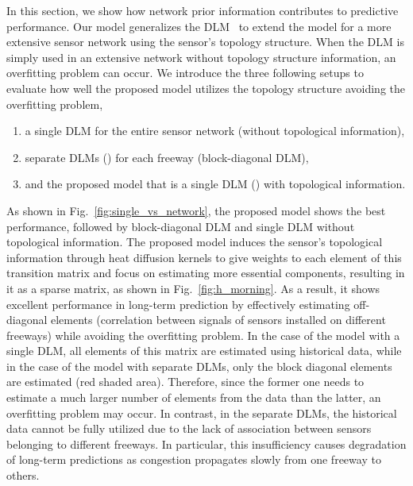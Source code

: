 \documentclass[journal]{IEEEtran}
\begin{document}
In this section, we show how network prior information contributes to predictive performance. 
Our model generalizes the DLM~\cite{kwak2020travel} to extend the model for a more extensive sensor network using the sensor's topology structure. 
When the DLM is simply used in an extensive network without topology structure information, an overfitting problem can occur. 
We introduce the three following setups to evaluate how well the proposed model utilizes the topology structure avoiding the overfitting problem,
\begin{enumerate}
\item a single DLM for the entire sensor network (without topological information),
\item separate DLMs () for each freeway (block-diagonal DLM),
\item and the proposed model that is a single DLM () with topological information.
\end{enumerate}


As shown in Fig.~\ref{fig:single_vs_network}, the proposed model shows the best performance, followed by block-diagonal DLM and single DLM without topological information.
The proposed model induces the sensor's topological information through heat diffusion kernels to give weights to each element of this transition matrix and focus on estimating more essential components, resulting in it as a sparse matrix, as shown in Fig.~\ref{fig:h_morning}. As a result, it shows excellent performance in long-term prediction by effectively estimating off-diagonal elements (correlation between signals of sensors installed on different freeways) while avoiding the overfitting problem.
In the case of the model with a single DLM, all elements of this matrix are estimated using historical data, while in the case of the model with separate DLMs, only the block diagonal elements are estimated (red shaded area). Therefore, since the former one needs to estimate a much larger number of elements from the data than the latter, an overfitting problem may occur. 
In contrast, in the separate DLMs, the historical data cannot be fully utilized due to the lack of association between sensors belonging to different freeways. In particular, this insufficiency causes degradation of long-term predictions as congestion propagates slowly from one freeway to others.
\end{document}
